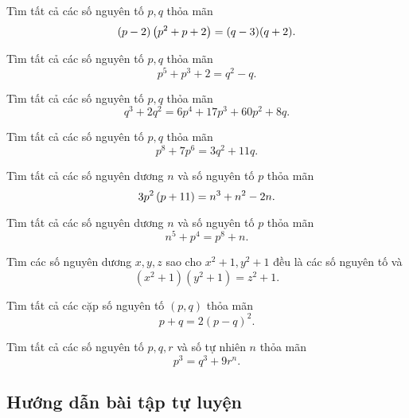 \begin{btt}
Tìm tất cả các số nguyên tố $p,q$ thỏa mãn
\[(p-2)\left(\displaystyle p^2+p+2 \right)=(q-3)(q+2).\]
\end{btt}

\begin{btt}
Tìm tất cả các số nguyên tố $p,q$ thỏa mãn \[p^5+p^3+2=q^2-q.\]
\end{btt}

\begin{btt}
Tìm tất cả các số nguyên tố $p,q$ thỏa mãn
\[q^3+2q^2=6p^4+17p^3+60p^2+8q.\]
\end{btt}

\begin{btt}
Tìm tất cả các số nguyên tố $p,q$ thỏa mãn
\[p^8+7p^6=3q^2+11q.\]
\end{btt}

\begin{btt}
Tìm tất cả các số nguyên dương $n$ và số nguyên tố $p$ thỏa mãn
\[3p^2\left(\displaystyle p+11 \right)=n^3+n^2-2n.\]
\end{btt}

\begin{btt}
Tìm tất cả các số nguyên dương $n$ và số nguyên tố $p$ thỏa mãn
\[n^5+p^4=p^8+n.\]
\end{btt}

\begin{btt}
Tìm các số nguyên dương $x, y, z$ sao cho $x^{2}+1, y^{2}+1$ đều là các số nguyên tố và
$$\left(x^{2}+1\right)\left(y^{2}+1\right)=z^{2}+1.$$
\end{btt}

\begin{btt}
Tìm tất cả các cặp số nguyên tố $(p,q)$ thỏa mãn 
\[p+q=2(p-q)^2.\]
\end{btt}

\begin{btt}
Tìm tất cả các số nguyên tố $p,q,r$ và số tự nhiên $n$ thỏa mãn
\[p^3=q^3+9r^n.\]

\end{btt}

\subsection*{Hướng dẫn bài tập tự luyện}

